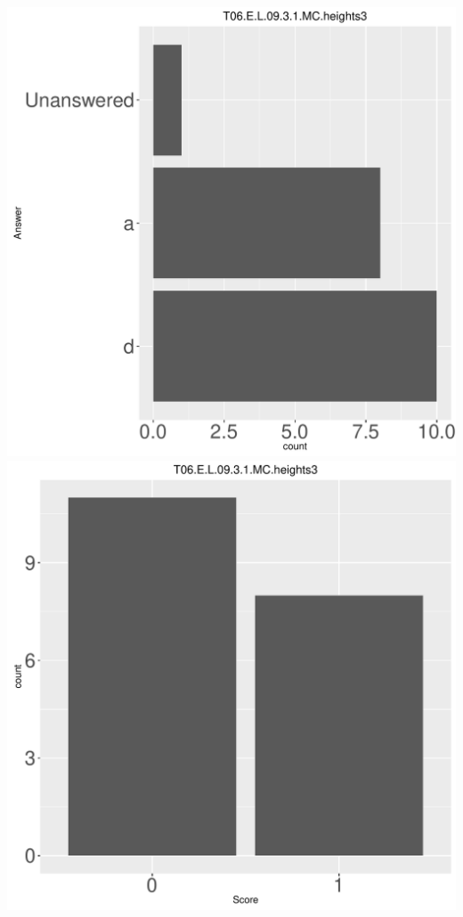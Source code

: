 \documentclass[12pt,english,nohyper]{tufte-handout}\usepackage[]{graphicx}\usepackage[]{color}
\begin{document}
\begin{center} \includegraphics[width=.45\linewidth]{Topic06_AB_38_answer} \includegraphics[width=.45\linewidth]{Topic06_AB_38_score} \end{center} 
\end{document}
